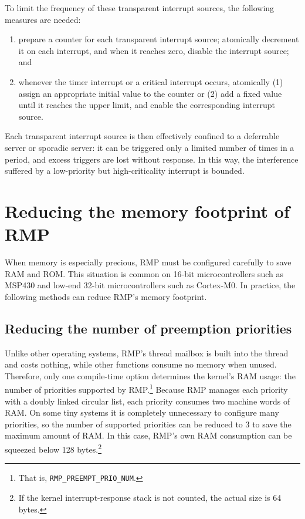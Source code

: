 To limit the frequency of these transparent interrupt sources, the following measures are needed:

\begin{enumerate}
    \item prepare a counter for each transparent interrupt source; atomically decrement it on each interrupt, and when it reaches zero, disable the interrupt source; and
    \item whenever the timer interrupt or a critical interrupt occurs, atomically (1) assign an appropriate initial value to the counter or (2) add a fixed value until it reaches the upper limit, and enable the corresponding interrupt source.
\end{enumerate}

Each transparent interrupt source is then effectively confined to a deferrable server or sporadic server: it can be triggered only a limited number of times in a period, and excess triggers are lost without response.
In this way, the interference suffered by a low-priority but high-criticality interrupt is bounded.
\section{Reducing the memory footprint of RMP}

When memory is especially precious, RMP must be configured carefully to save RAM and ROM.
This situation is common on 16-bit microcontrollers such as MSP430 and low-end 32-bit microcontrollers such as Cortex-M0.
In practice, the following methods can reduce RMP's memory footprint.

\subsection{Reducing the number of preemption priorities}

Unlike other operating systems, RMP's thread mailbox is built into the thread and costs nothing, while other functions consume no memory when unused.
Therefore, only one compile-time option determines the kernel's RAM usage: the number of priorities supported by RMP.\footnote{That is, \texttt{RMP\_PREEMPT\_PRIO\_NUM}.}
Because RMP manages each priority with a doubly linked circular list, each priority consumes two machine words of RAM.
On some tiny systems it is completely unnecessary to configure many priorities, so the number of supported priorities can be reduced to 3 to save the maximum amount of RAM.
In this case, RMP's own RAM consumption can be squeezed below 128 bytes.\footnote{If the kernel interrupt-response stack is not counted, the actual size is 64 bytes.}

